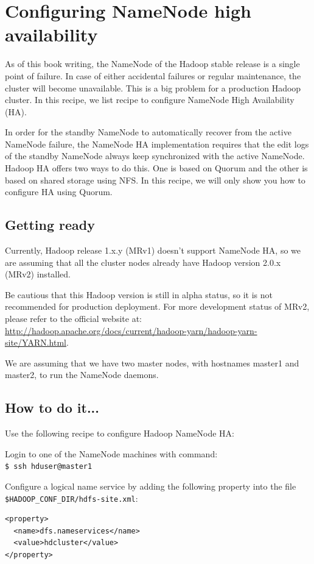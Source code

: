 \section{Configuring NameNode high availability}
As of this book writing, the NameNode of the Hadoop stable release is a single point of failure. In case of either accidental failures or regular maintenance, the cluster will become unavailable. This is a big problem for a production Hadoop cluster. In this recipe, we list recipe to configure NameNode High Availability (HA).

In order for the standby NameNode to automatically recover from the active NameNode failure, the NameNode HA implementation requires that the edit logs of the standby NameNode always keep synchronized with the active NameNode. Hadoop HA offers two ways to do this. One is based on Quorum and the other is based on shared storage using NFS. In this recipe, we will only show you how to configure HA using Quorum.
\subsection*{Getting ready}
Currently, Hadoop release 1.x.y (MRv1) doesn't support NameNode HA, so we are assuming that all the cluster nodes already have Hadoop version 2.0.x (MRv2) installed.

Be cautious that this Hadoop version is still in alpha status, so it is not recommended for production deployment. For more development status of MRv2, please refer to the official website at:  \url{http://hadoop.apache.org/docs/current/hadoop-yarn/hadoop-yarn-site/YARN.html}.

We are assuming that we have two master nodes, with hostnames master1 and master2, to run the NameNode daemons.
\subsection*{How to do it...}
Use the following recipe to configure Hadoop NameNode HA:

Login to one of the NameNode machines with command: \\
\verb|$ ssh hduser@master1|

Configure a logical name service by adding the following property into the file \verb|$HADOOP_CONF_DIR/hdfs-site.xml|:
\lstset{style=bashstyle}
\begin{lstlisting}
<property>
  <name>dfs.nameservices</name>
  <value>hdcluster</value>
</property>
\end{lstlisting}

